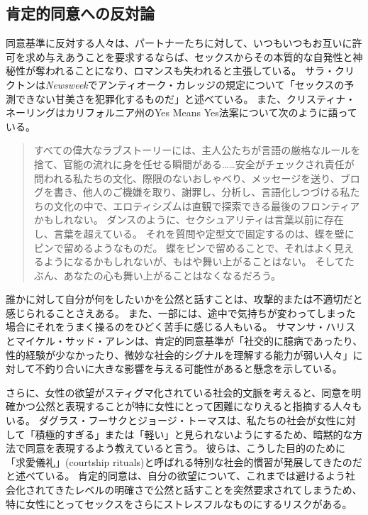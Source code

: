 \documentclass[paper=a4,book,openany]{jlreq} \usepackage{mystyle}
\begin{document}
\subsection{肯定的同意への反対論}

同意基準に反対する人々は、パートナーたちに対して、いつもいつもお互いに許可を求め与えあうことを要求するならば、セックスからその本質的な自発性と神秘性が奪われることになり、ロマンスも失われると主張している。
サラ・クリクトンは\emph{Newsweek}でアンティオーク・カレッジの規定について「セックスの予測できない甘美さを犯罪化するものだ」と述べている\citep{crichton93:_sexual_correc}。
また、クリスティナ・ネーリングはカリフォルニア州のYes Means Yes法案について次のように語っている。

\begin{quote}

すべての偉大なラブストーリーには、主人公たちが言語の厳格なルールを捨て、官能の流れに身を任せる瞬間がある……安全がチェックされ責任が問われる私たちの文化、際限のないおしゃべり、メッセージを送り、ブログを書き、他人のご機嫌を取り、謝罪し、分析し、言語化しつづける私たちの文化の中で、エロティシズムは直観で探索できる最後のフロンティアかもしれない。
ダンスのように、セクシュアリティは言葉以前に存在し、言葉を超えている。
それを質問や定型文で固定するのは、蝶を壁にピンで留めるようなものだ。
蝶をピンで留めることで、それはよく見えるようになるかもしれないが、もはや舞い上がることはない。
そしてたぶん、あなたの心も舞い上がることはなくなるだろう。
\citep{nehring15:_are_today_legal_defin_rape}
\end{quote}

誰かに対して自分が何をしたいかを公然と話すことは、攻撃的または不適切だと感じられることさえある。
また、一部には、途中で気持ちが変わってしまった場合にそれをうまく操るのをひどく苦手に感じる人もいる。
サマンサ・ハリスとマイケル・サッド・アレンは、肯定的同意基準が「社交的に臆病であったり、性的経験が少なかったり、微妙な社会的シグナルを理解する能力が弱い人々」に対して不釣り合いに大きな影響を与える可能性があると懸念を示している\citep{harris20:_bad_vibrat}。

さらに、女性の欲望がスティグマ化されている社会的文脈を考えると、同意を明確かつ公然と表現することが特に女性にとって困難になりえると指摘する人々もいる。
ダグラス・フーサクとジョージ・トーマスは、私たちの社会が女性に対して「積極的すぎる」または「軽い」と見られないようにするため、暗黙的な方法で同意を表現するよう教えていると言う。
彼らは、こうした目的のために「求愛儀礼」(courtship rituals)と呼ばれる特別な社会的慣習が発展してきたのだと述べている。
肯定的同意は、自分の欲望について、これまでは避けるよう社会化されてきたレベルの明確さで公然と話すことを突然要求されてしまうため、特に女性にとってセックスをさらにストレスフルなものにするリスクがある\citep{husak92:_date}。
\end{document}
